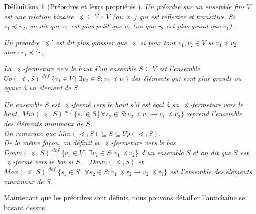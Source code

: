 \documentclass[12pt,a4paper,oneside]{book}
\theoremstyle{break}
\newtheorem{defin}{Définition}[chapter]
\theoremstyle{breakplain}
\begin{document}
\pagebreak

\begin{defin}[Préordres et leurs propriétés \cite{doyen2010antichain}]
Un préordre sur un ensemble fini $V$ est une relation binaire $\preceq \subseteq V \times V$ (ou $\succeq$) qui est réflexive et transitive. Si $v_1 \preceq v_2$, on dit que $v_1$ est plus petit que $v_2$ (ou que $v_2$ est plus grand que $v_1$).

Un préordre $\preceq'$ est dit plus grossier que $\preceq$ si pour tout $v_1, v_2 \in V$ si $v_1 \preceq v_2$ alors $v_1 \preceq' v_2$.

La $\preceq$-fermeture vers le haut d'un ensemble $S \subseteq V$ est l'ensemble $Up(\preceq, S) \overset{def}{=} \{ v_1 \in V\ |\ \exists v_2 \in S : v_2 \preceq v_1 \}$ des éléments qui sont plus grands ou égaux à un élément de $S$.

Un ensemble $S$ est $\preceq$-fermé vers le haut s'il est égal à sa $\preceq$-fermeture vers le haut, $Min(\preceq, S) \overset{def}{=} \{s_1 \in S\ |\ \forall s_2 \in S : v_2 \preceq v_1 \rightarrow v_1 \preceq v_2 \}$ reprend l'ensemble des éléments minimaux de $S$.\\

On remarque que $Min(\preceq, S) \subseteq S \subseteq Up(\preceq, S)$.\\

De la même façon, on définit la $\preceq$-fermeture vers le bas $Down(\preceq, S) \overset{def}{=} \{ v_1 \in V\ |\ \exists v_2 \in S : v_1 \preceq v_2 \}$ d'un ensemble $S$ et on dit que $S$ est $\preceq$-fermé vers le bas si $S = Down(\preceq, S)$ et $Max(\preceq, S) \overset{def}{=} \{s_1 \in S\ |\ \forall s_2 \in S : v_1 \preceq v_2 \rightarrow v_2 \preceq v_1 \}$ est l'ensemble des éléments maximaux de S.
\end{defin}

Maintenant que les préordres sont définis, nous pouvons détailler l'antichaîne se basant dessus.\\
\end{document}
